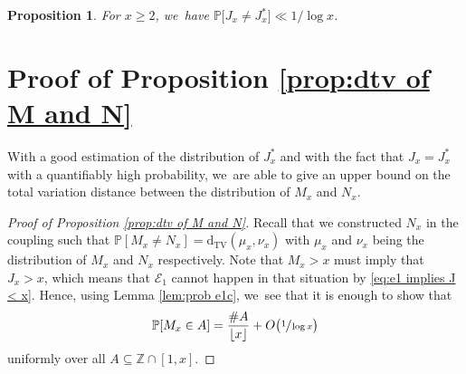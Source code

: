 \documentclass[JEP,XML,SOM,Unicode,published]{cedram}
\newcommand{\ZZ}{\mathbb{Z}}
\newcommand{\PP}{\mathbb{P}}
\newcommand{\EC}{\mathcal{E}}
\newcommand{\floor}[1]{\left\lfloor #1 \right\rfloor}
\newcommand{\dtv}{\mathrm{d}_{\mathrm{TV}}}
\newcommand{\bg}{\big}
\theoremstyle{plain}
\newtheorem{prop}[cor]{Proposition}
\theoremstyle{definition}
\begin{document}
\begin{prop}
\label{prop:prob J neq J*}
For $x\ge2$, we~have $\PP\bg[J_x \ne J_x^*\bg] \ll 1/\log x$.
\end{prop}

\section{Proof of Proposition \ref{prop:dtv of M and N}}
\label{sec:dtv}

With a good estimation of the distribution of $J_x^*$ and with the fact that $J_x = J_x^*$ with a quantifiably high probability, we~are able to give an upper bound on the total variation distance between the distribution of $M_x$ and $N_x$.

\begin{proof}[Proof of Proposition \ref{prop:dtv of M and N}]
Recall that we constructed $N_x$ in the coupling such that $\PP[M_x \ne N_x] = \dtv(\mu_x, \nu_x)$ with $\mu_x$ and $\nu_x$ being the distribution of $M_x$ and $N_x$ respectively. Note that $M_x > x$ must imply that $J_x > x$, which means that $\EC_1$ cannot happen in that situation by \eqref{eq:e1 implies J < x}. Hence, using Lemma \ref{lem:prob e1c}, we~see that it is enough to show that
\[
\PP[M_x \in A] = \frac{\# A}{\floor x} + O\bg(\sfrac{1}{\log x}\bg)
\]
uniformly over all $A \subseteq \ZZ \cap [1, x]$.


\end{proof}
\end{document}
